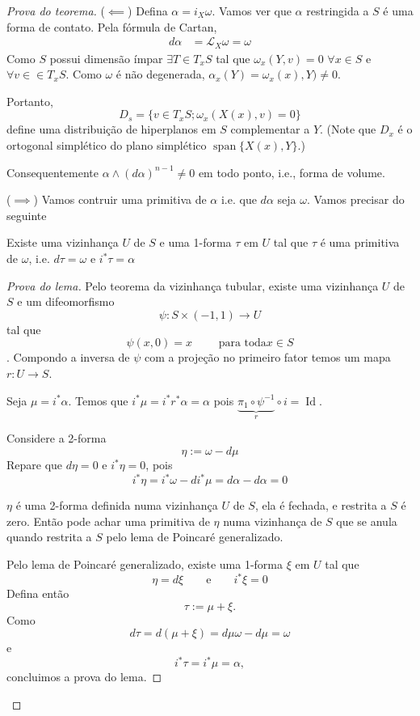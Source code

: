 \begin{proof}[Prova do teorema]\leavevmode
	($\impliedby$) Defina $\alpha=i_X\omega$. Vamos ver que $\alpha$ restringida a $S$ é uma forma de contato. Pela fórmula de Cartan,
	\begin{align*}
		d\alpha&=\mathcal{L}_X\omega=\omega
	\end{align*}
	Como $S$ possui dimensão ímpar $\exists T\in T_xS$ tal que $\omega_x(Y,v)=0$ $\forall  x\in S$ e $\forall v \in \in T_xS$. Como $\omega$ é não degenerada, $\alpha_x(Y)=\omega_x(x),Y)\neq 0$.

	Portanto,
	\[D_s=\{v\in T_xS;\omega_x(X(x),v)=0\}\]
	define uma distribuição de hiperplanos em $S$ complementar a $Y$. (Note que $D_x$ é o ortogonal simplético do plano simplético $ \operatorname{s p a n}\{X(x),Y\}$.)

Consequentemente $\alpha\wedge (d\alpha)^{n-1}\neq 0$ em todo ponto, i.e., forma de volume.

($\implies $) Vamos contruir uma primitiva de $\alpha$ i.e. que $d\alpha$ seja $\omega$. Vamos precisar do seguinte

\begin{lemma}\leavevmode
	Existe uma vizinhança $U$ de $S$ e uma 1-forma $\tau$ em $U$ tal que $\tau$ é uma primitiva de $\omega$, i.e. $d\tau=\omega$ e $i^*\tau=\alpha$
\end{lemma}

\begin{proof}[Prova do lema]\leavevmode
	Pelo teorema da vizinhança tubular, existe uma vizinhança $U$ de $S$ e um difeomorfismo \[\psi:S\times (-1,1)\to U\] tal que \[\psi(x,0)=x\qquad  \text{ para toda}x \in S\]. Compondo a inversa de $\psi$ com a projeção no primeiro fator temos um mapa $r:U\to S$.

	Seja $\mu=i^*\alpha$. Temos que $i^*\mu=i^*r^*\alpha=\alpha$ pois $\underbrace{\pi_1 \circ \psi^{-1}}_{r}\circ i=\operatorname{Id}$.

	Considere a 2-forma
	\[\eta:=\omega-d\mu\]
	Repare que $d\eta=0$ e $i^*\eta=0$, pois
	\[i^*\eta=i^*\omega-di^*\mu=d\alpha-d\alpha=0\]

	{\color{3}$\eta$ é uma 2-forma definida numa vizinhança $U$ de $S$, ela é fechada, e restrita a $S$ é zero. Então pode achar uma primitiva de $\eta$ numa vizinhança de $S$ que se anula quando restrita a $S$ pelo lema de Poincaré generalizado.}

	Pelo lema de Poincaré generalizado, existe uma 1-forma $\xi$ em $U$ tal que
	 \[\eta=d\xi\qquad \text{e}\qquad i^*\xi=0 \]
	 Defina então
	 \[\tau:=\mu+\xi.\]
	 Como
	 \[d\tau=d(\mu+\xi)=d\mu \omega-d\mu=\omega\]
	 e
	 \[i^*\tau=i^*\mu=\alpha,\]
	 concluimos a prova do lema.
\end{proof}


\end{proof}

